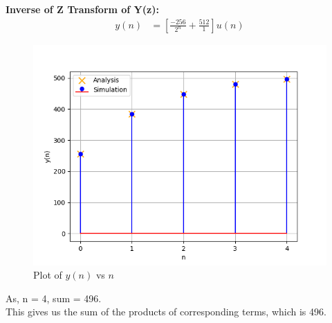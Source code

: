 \documentclass[journal,12pt,twocolumn]{IEEEtran}
\theoremstyle{remark}
\begin{document}
\textbf{Inverse of Z Transform of Y(z):} \\
\begin{align}
y(n) &= \left[\frac{-256}{2^{n}} + \frac{512}{1}\right]u(n)
\end{align}
\begin{figure}[h!]
    \centering
    \includegraphics[width=\columnwidth]{ncert-maths/11/9/3/19/figs/fig1.png}
    \caption{Plot of $y(n)$ vs $n$}
    \label{fig.11.9.3.19:1}
\end{figure}
As, n = 4, sum = 496. \\
This gives us the sum of the products of corresponding terms, which is 496.
\end{document}
